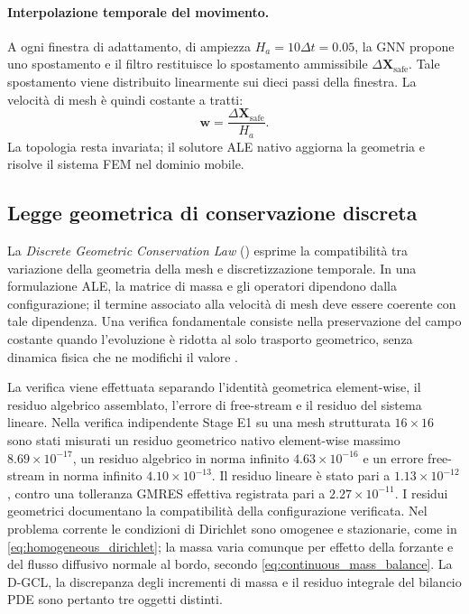 \paragraph{Interpolazione temporale del movimento.}
A ogni finestra di adattamento, di ampiezza $H_a=10\Delta t=0.05$, la GNN propone uno spostamento e il filtro restituisce lo spostamento ammissibile $\Delta\bm X_{\mathrm{safe}}$. Tale spostamento viene distribuito linearmente sui dieci passi della finestra. La velocità di mesh è quindi costante a tratti:
\begin{equation}
\bm w=\frac{\Delta\bm X_{\mathrm{safe}}}{H_a}.
\label{eq:mesh_velocity}
\end{equation}
La topologia resta invariata; il solutore ALE nativo aggiorna la geometria e risolve il sistema FEM nel dominio mobile.

\subsection{Legge geometrica di conservazione discreta}

La \emph{Discrete Geometric Conservation Law} (\DGC) esprime la compatibilità tra variazione della geometria della mesh e discretizzazione temporale. In una formulazione ALE, la matrice di massa e gli operatori dipendono dalla configurazione; il termine associato alla velocità di mesh deve essere coerente con tale dipendenza. Una verifica fondamentale consiste nella preservazione del campo costante quando l'evoluzione è ridotta al solo trasporto geometrico, senza dinamica fisica che ne modifichi il valore \citep{farhat2001the,guillard2000on,formaggia2004stability}.

La verifica viene effettuata separando l'identità geometrica element-wise, il residuo algebrico assemblato, l'errore di free-stream e il residuo del sistema lineare. Nella verifica indipendente Stage E1 su una mesh strutturata $16\times16$ sono stati misurati un residuo geometrico nativo element-wise massimo $8.69\times10^{-17}$, un residuo algebrico in norma infinito $4.63\times10^{-16}$ e un errore free-stream in norma infinito $4.10\times10^{-13}$. Il residuo lineare è stato pari a $1.13\times10^{-12}$, contro una tolleranza GMRES effettiva registrata pari a $2.27\times10^{-11}$. I residui geometrici documentano la compatibilità della configurazione verificata. Nel problema corrente le condizioni di Dirichlet sono omogenee e stazionarie, come in \eqref{eq:homogeneous_dirichlet}; la massa varia comunque per effetto della forzante e del flusso diffusivo normale al bordo, secondo \eqref{eq:continuous_mass_balance}. La D-GCL, la discrepanza degli incrementi di massa e il residuo integrale del bilancio PDE sono pertanto tre oggetti distinti.

